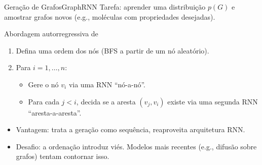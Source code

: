 \documentclass[aspectratio=169,xcolor=dvipsnames]{beamer}
\begin{document}
  \begin{frame}{Geração de Grafos}{GraphRNN}
    Tarefa: aprender uma distribuição $p(G)$ e amostrar grafos novos
    (e.g., moléculas com propriedades desejadas).

    \vspace{0.4em}
    \begin{block}{Abordagem autorregressiva de }
      \begin{enumerate}
        \item Defina uma ordem dos nós (BFS a partir de um nó aleatório).
        \item Para $i = 1, \ldots, n$:
          \begin{itemize}
            \item Gere o nó $v_i$ via uma RNN \enquote{nó-a-nó}.
            \item Para cada $j < i$, decida se a aresta $(v_j, v_i)$ existe
                  via uma segunda RNN \enquote{aresta-a-aresta}.
          \end{itemize}
      \end{enumerate}
    \end{block}

    \vspace{0.3em}
    \begin{itemize}
      \item Vantagem: trata a geração como sequência, reaproveita arquitetura RNN.
      \item Desafio: a ordenação introduz viés. Modelos mais recentes (e.g.,
            difusão sobre grafos) tentam contornar isso.
    \end{itemize}
  \end{frame}
\end{document}

